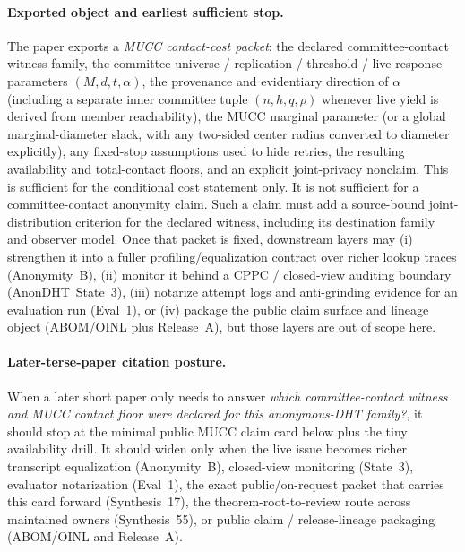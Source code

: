 \documentclass[11pt]{article}
\begin{document}
\paragraph{Exported object and earliest sufficient stop.}
The paper exports a \emph{MUCC contact-cost packet}: the declared committee-contact witness family, the committee universe / replication / threshold / live-response parameters \((M,d,t,\alpha)\), the provenance and evidentiary direction of \(\alpha\) (including a separate inner committee tuple \((n,h,q,\rho)\) whenever live yield is derived from member reachability), the MUCC marginal parameter (or a global marginal-diameter slack, with any two-sided center radius converted to diameter explicitly), any fixed-stop assumptions used to hide retries, the resulting availability and total-contact floors, and an explicit joint-privacy nonclaim.
This is sufficient for the conditional cost statement only.  It is not sufficient for a committee-contact anonymity claim.  Such a claim must add a source-bound joint-distribution criterion for the declared witness, including its destination family and observer model.
Once that packet is fixed, downstream layers may (i) strengthen it into a fuller profiling/equalization contract over richer lookup traces (Anonymity~B), (ii) monitor it behind a CPPC / closed-view auditing boundary (AnonDHT~State~3), (iii) notarize attempt logs and anti-grinding evidence for an evaluation run (Eval~1), or (iv) package the public claim surface and lineage object (ABOM/OINL plus Release~A), but those layers are out of scope here.\cite{series:profiling,series:state3,series:evalnotary,series:abomoinl,series:release}

\paragraph{Later-terse-paper citation posture.}
When a later short paper only needs to answer \emph{which committee-contact witness and MUCC contact floor were declared for this anonymous-DHT family?}, it should stop at the minimal public MUCC claim card below plus the tiny availability drill.
It should widen only when the live issue becomes richer transcript equalization (Anonymity~B), closed-view monitoring (State~3), evaluator notarization (Eval~1), the exact public/on-request packet that carries this card forward (Synthesis~17), the theorem-root-to-review route across maintained owners (Synthesis~55), or public claim / release-lineage packaging (ABOM/OINL and Release~A).\cite{series:profiling,series:state3,series:evalnotary,series:workedexample,series:seriesspines,series:abomoinl,series:release}
\end{document}
